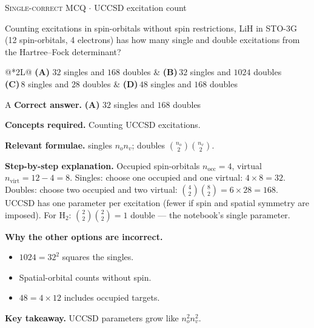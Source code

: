 \documentclass[11pt,a4paper]{article}
\newcommand{\optlabel}[1]{\textbf{(#1)}}
\newcommand{\correctlabel}[1]{\textcolor{okgreen}{\textbf{(#1)}\,\ding{51}}}
\newenvironment{qitem}[1]{\begin{list}{}{\setlength{\leftmargin}{3.3em}\setlength{\labelwidth}{3.1em}%
  \setlength{\labelsep}{0.2em}\setlength{\topsep}{3pt}\setlength{\parsep}{3pt}}\item[\textbf{Q.#1}\hfill]}{\end{list}}
\newcommand{\qsep}{\par\vspace{2pt}{\color{black!15}\hrule}\vspace{4pt}}
\newcommand{\qmeta}[2]{{\footnotesize\color{black!60}\textsc{#1} \;$\cdot$\; #2}\par}
\begin{document}
\begin{qitem}{66}
\qmeta{Single-correct MCQ}{UCCSD excitation count}
Counting excitations in spin-orbitals without spin restrictions, LiH in STO-3G (12 spin-orbitals, 4 electrons) has how many single and double
excitations from the Hartree--Fock determinant?
\par\smallskip\noindent\begin{tabularx}{\linewidth}{@{}*{2}{L}@{}}
\correctlabel{A}\,$32$ singles and $168$ doubles & \optlabel{B}\,$32$ singles and $1024$ doubles \\[3pt]
\optlabel{C}\,$8$ singles and $28$ doubles & \optlabel{D}\,$48$ singles and $168$ doubles
\end{tabularx}
\end{qitem}
\begin{solbox}{A}
\textbf{\color{brand}Correct answer.} \textcolor{okgreen}{\textbf{(A)}} $32$ singles and $168$ doubles

\textbf{\color{brand}Concepts required.} Counting UCCSD excitations.

\textbf{\color{brand}Relevant formulae.} singles $n_on_v$; doubles $\binom{n_o}{2}\binom{n_v}{2}$.

\textbf{\color{brand}Step-by-step explanation.} Occupied spin-orbitals $n_{\mathrm{occ}} = 4$, virtual $n_{\mathrm{virt}} = 12 - 4 = 8$. Singles: choose one occupied and one virtual: $4\times8 = 32$.
Doubles: choose two occupied and two virtual: $\binom42\binom82 = 6\times28 = 168$. UCCSD has one parameter per excitation (fewer if spin and
spatial symmetry are imposed). For H$_2$: $\binom22\binom22 = 1$ double --- the notebook's single parameter.

\textbf{\color{brand}Why the other options are incorrect.}
\begin{itemize}[leftmargin=2.4em, itemsep=1pt, topsep=2pt]
\item[\textbf{(B)}] $1024 = 32^2$ squares the singles.
\item[\textbf{(C)}] Spatial-orbital counts without spin.
\item[\textbf{(D)}] $48 = 4\times12$ includes occupied targets.
\end{itemize}
\textbf{\color{brand}Key takeaway.} UCCSD parameters grow like $n_o^2n_v^2$.
\end{solbox}
\qsep
\end{document}
